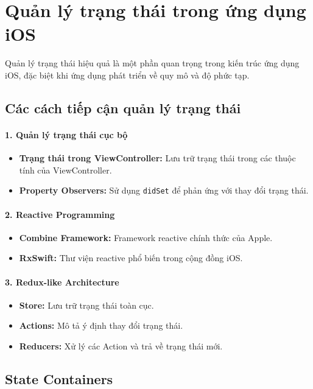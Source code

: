 \section{Quản lý trạng thái trong ứng dụng iOS}

Quản lý trạng thái hiệu quả là một phần quan trọng trong kiến trúc ứng dụng iOS, đặc biệt khi ứng dụng phát triển về quy mô và độ phức tạp.

\subsection{Các cách tiếp cận quản lý trạng thái}

\paragraph*{1. Quản lý trạng thái cục bộ}
\begin{itemize}
  \item \textbf{Trạng thái trong ViewController:} Lưu trữ trạng thái trong các thuộc tính của ViewController.
  \item \textbf{Property Observers:} Sử dụng \texttt{didSet} để phản ứng với thay đổi trạng thái.
\end{itemize}

\paragraph*{2. Reactive Programming}
\begin{itemize}
  \item \textbf{Combine Framework:} Framework reactive chính thức của Apple.
  \item \textbf{RxSwift:} Thư viện reactive phổ biến trong cộng đồng iOS.
\end{itemize}
\paragraph*{3. Redux-like Architecture}
\begin{itemize}
  \item \textbf{Store:} Lưu trữ trạng thái toàn cục.
  \item \textbf{Actions:} Mô tả ý định thay đổi trạng thái.
  \item \textbf{Reducers:} Xử lý các Action và trả về trạng thái mới.
\end{itemize}

\subsection{State Containers}

